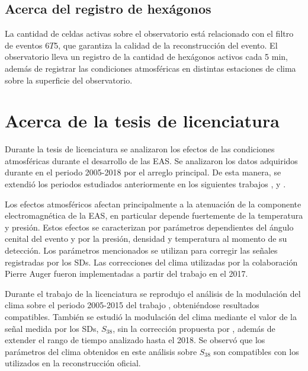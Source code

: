 \subsection{Acerca del registro de hexágonos}\label{hexagonos_rate}

La cantidad de celdas  activas sobre el observatorio está relacionado con el filtro de eventos $6T5$, que garantiza la calidad de la reconstrucción del evento. El observatorio lleva un registro de la cantidad de hexágonos activos cada 5 min, además de registrar las condiciones atmosféricas en distintas estaciones de clima sobre la superficie del observatorio. 


\section{Acerca de la tesis de licenciatura}

Durante la tesis de licenciatura se analizaron los efectos de las condiciones atmosféricas durante el desarrollo de las EAS.  Se analizaron los datos adquiridos durante en el periodo 2005-2018 por el arreglo principal. De esta manera, se extendió los periodos estudiados anteriormente en los siguientes trabajos \cite{abraham2009atmospheric}, \cite{abreu2012description}   y \cite{aab2017impact}. 

Los efectos atmosféricos afectan principalmente a la atenuación de la componente electromagnética  de la EAS, en particular depende fuertemente de la temperatura y presión. Estos efectos  se caracterizan por parámetros dependientes del ángulo cenital del evento y por la presión, densidad y temperatura al momento de su detección. Los parámetros mencionados se utilizan para corregir las señales registradas por los SDs. Las correcciones del clima utilizadas por la colaboración Pierre Auger fueron implementadas a partir del trabajo \cite{aab2017impact} en el 2017. 

Durante el trabajo de la licenciatura se reprodujo el análisis de la modulación del clima sobre el periodo 2005-2015 del trabajo \cite{aab2017impact}, obteniéndose resultados compatibles. También se estudió la modulación del clima mediante el valor de la señal medida por los SDs, $S_{38}$, sin la corrección propuesta por \cite{aab2017impact}, además de extender el rango de tiempo analizado hasta el 2018. Se observó que los parámetros del clima obtenidos en este análisis sobre  $S_{38}$  son compatibles con los utilizados en la reconstrucción oficial. 